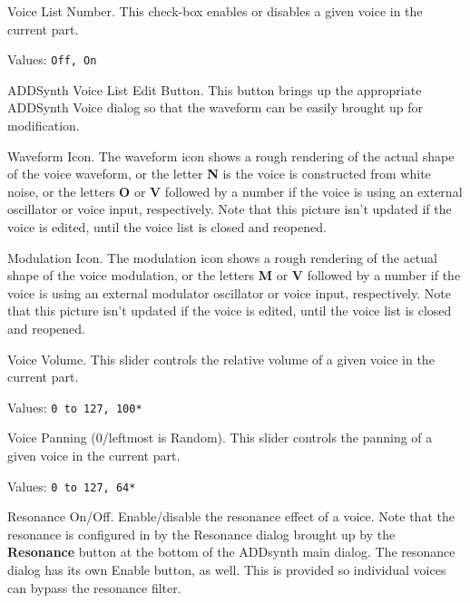    \setcounter{ItemCounter}{0}      %

   Voice List Number.
   This check-box enables or disables a given voice in the current part.

   Values: \texttt{Off, On}

   ADDSynth Voice List Edit Button.
   This button brings up the appropriate ADDSynth Voice dialog so that the
   waveform can be easily brought up for modification.

   Waveform Icon.
   The waveform icon shows a rough rendering of the actual shape of the voice
   waveform, or the letter \textbf{N} is the voice is constructed from white
   noise, or the letters \textbf{O} or \textbf{V} followed by a number if the
   voice is using an external oscillator or voice input, respectively.
   Note that this picture isn't updated if the voice is edited, until the voice
   list is closed and reopened.


  Modulation Icon.
  The modulation icon shows a rough rendering of the actual shape of the voice
  modulation, or the letters \textbf{M} or \textbf{V} followed by a number if
  the voice is using an external modulator oscillator or voice input,
  respectively.
  Note that this picture isn't updated if the voice is edited, until the voice
  list is closed and reopened.

   Voice Volume.
   This slider controls the relative volume of a given voice in the current
   part.

   Values: \texttt{0 to 127, 100*}

   Voice Panning (0/leftmost is Random).
   This slider controls the panning of a given voice in the current part.

   Values: \texttt{0 to 127, 64*}

   Resonance On/Off.
   Enable/disable the resonance effect of a voice.
   Note that the resonance is configured in by the Resonance dialog brought
   up by the \textbf{Resonance} button at the bottom of the ADDsynth main
   dialog.  The resonance dialog has its own Enable button, as well.
   This is provided so individual voices can bypass the resonance filter.

